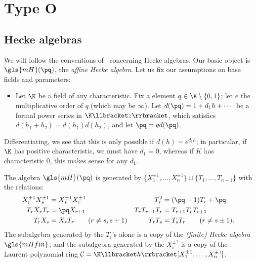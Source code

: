 \section{Type O}

\subsection{Hecke algebras}
We will follow the conventions of~\cite{BKKL} concerning Hecke
algebras. 
Our basic object is $\gls{mH}(\pq)$, the \emph{affine Hecke algebra}. 
Let us fix our assumptions on base fields and parameters:
\begin{itemize}
\item [$(*)$] Let $\K$ be a field of any characteristic. Fix a element
$q\in \K\setminus\{0,1\}$; let $e$ the multiplicative order of $q$
(which may be $\infty$). Let $d(\pq)=1+d_1h+\cdots$ be a formal power series in
$\K\llbracket z\rrbracket $, which satisfies $d(h_1+h_2)=d(h_1)d(h_2)$, and let $\pq=qd(\pq)$. 
\end{itemize}
Differentiating, we see that this is only possible if $d(h)=e^{d_1h}$; in
particular, if $\K$ has positive characteristic, we must have
$d_1=0$, whereas if $K$ has characteristic 0, this makes sense for any
$d_1$.




The algebra $\gls{mH}(\pq)$ is generated by $\{X_1^{\pm 1},\dots,X_n^{\pm 1}
\}\cup \{T_1,\dots, T_{n-1}\}$ with the relations:
\begin{align*}
 X_r^{\pm 1} X_s^{\pm 1}&= X_s^{\pm 1} X_r^{\pm 1}& T_r^2&=(\pq-1)T_r
+\pq\\
T_rX_rT_r&=\pq X_{r+1} & T_rT_{r+1}T_r&=T_{r+1}T_r T_{r+1}\\
T_rX_s&= X_sT_r\qquad (r\neq s,s+1)&T_rT_s&=T_sT_r\qquad (r \neq
s\pm 1).
 \end{align*}
The subalgebra generated by the $T_i$'s alone is a copy of the \emph{(finite) Hecke algebra} $\gls{mHfin}$, and the subalgebra generated by the
$X_i^{\pm 1}$ is a copy of the Laurent polynomial ring
$\mathcal{C}=\K\llbracket h\rrbracket [X_1^{\pm 1},\dots,X_n^{\pm 1}]$.
 

